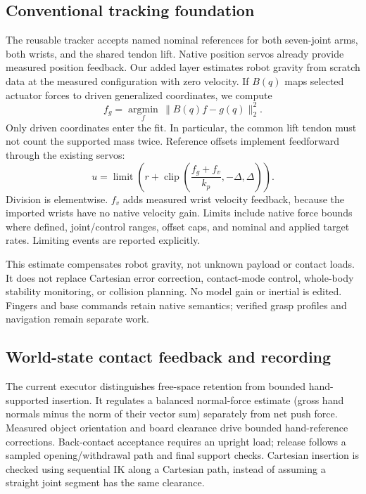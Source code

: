 \subsection{Conventional tracking foundation}
The reusable tracker accepts named nominal references for both seven-joint
arms, both wrists, and the shared tendon lift. Native position servos already
provide measured position feedback. Our added layer estimates robot gravity
from scratch data at the measured configuration with zero velocity. If $B(q)$
maps selected actuator forces to driven generalized coordinates, we compute
\begin{equation}
 f_g = \underset{f}{\operatorname{argmin}}\,
 \lVert B(q)f-g(q)\rVert_2^2.
\end{equation}
Only driven coordinates enter the fit. In particular, the common lift tendon
must not count the supported mass twice. Reference offsets implement feedforward
through the existing servos:
\begin{equation}
 u = \operatorname{limit}\!\left(r+
 \operatorname{clip}\!\left(\frac{f_g+f_v}{k_p},-\Delta,\Delta\right)\right).
\end{equation}
Division is elementwise. $f_v$ adds measured wrist velocity feedback, because
the imported wrists have no native velocity gain. Limits include native
force bounds where defined, joint/control ranges, offset caps, and nominal and
applied target rates. Limiting events are reported explicitly.

This estimate compensates robot gravity, not unknown payload or contact loads.
It does not replace Cartesian error correction, contact-mode control, whole-body
stability monitoring, or collision planning. No model gain or inertial is edited.
Fingers and base commands retain native semantics; verified grasp profiles and
navigation remain separate work.

\subsection{World-state contact feedback and recording}
The current executor distinguishes free-space retention from bounded
hand-supported insertion. It regulates a balanced normal-force estimate
(gross hand normals minus the norm of their vector sum) separately from net
push force. Measured object orientation and board clearance drive bounded
hand-reference corrections. Back-contact acceptance requires an upright load;
release follows a sampled opening/withdrawal path and final support checks.
Cartesian insertion is checked using sequential IK along a Cartesian path,
instead of assuming a straight joint segment has the same clearance.

